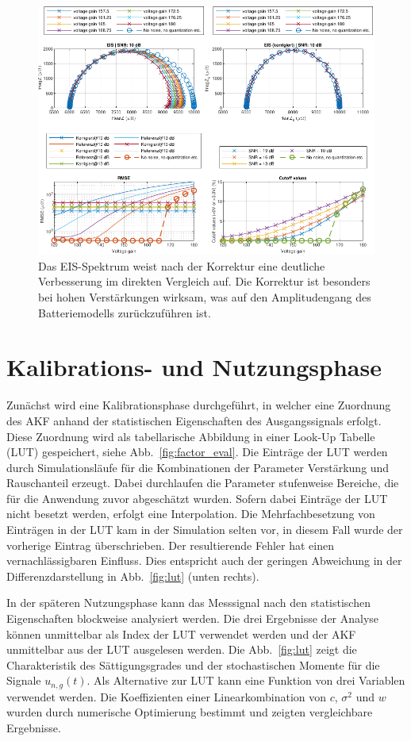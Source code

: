 \begin{figure}[t!]
	\centering
	\includegraphics[width=.9\textwidth]{../img/ergebnisse.pdf}
	\caption{Das EIS-Spektrum weist nach der Korrektur eine deutliche Verbesserung im direkten Vergleich auf. Die Korrektur ist besonders bei hohen Verstärkungen wirksam, was auf den Amplitudengang des Batteriemodells zurückzuführen ist.}
	\label{fig:Ergebnisse} 
\end{figure}

\section{Kalibrations- und Nutzungsphase}

Zunächst wird eine Kalibrationsphase durchgeführt, in welcher eine Zuordnung des AKF anhand der statistischen Eigenschaften des Ausgangssignals erfolgt. Diese Zuordnung wird als tabellarische Abbildung in einer Look-Up Tabelle (LUT) gespeichert, siehe Abb.~\ref{fig:factor_eval}. 
Die Einträge der LUT werden durch Simulationsläufe für die Kombinationen der Parameter Verstärkung und Rauschanteil erzeugt. Dabei durchlaufen die Parameter stufenweise Bereiche, die für die Anwendung zuvor abgeschätzt wurden. Sofern dabei Einträge der LUT nicht besetzt werden, erfolgt eine Interpolation.
Die Mehrfachbesetzung von Einträgen in der LUT kam in der Simulation selten vor, in diesem Fall wurde der vorherige Eintrag überschrieben. Der resultierende Fehler hat einen vernachlässigbaren Einfluss. Dies entspricht auch der geringen Abweichung in der Differenzdarstellung in Abb.~\ref{fig:lut} (unten rechts). 

In der späteren Nutzungsphase kann das Messsignal nach den statistischen Eigenschaften blockweise analysiert werden. Die drei Ergebnisse der Analyse können unmittelbar als Index der LUT verwendet werden und der AKF unmittelbar aus der LUT ausgelesen werden. Die Abb.~\ref{fig:lut} zeigt die Charakteristik des Sättigungsgrades und der stochastischen Momente für die Signale $u_{n,g}(t)$. Als Alternative zur LUT kann eine Funktion von drei Variablen verwendet werden. Die Koeffizienten einer Linearkombination von $c$, $\sigma^2$ und $w$ wurden durch numerische Optimierung bestimmt und zeigten vergleichbare Ergebnisse.

